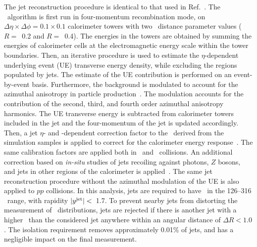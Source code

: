 
The jet reconstruction procedure is identical to that used in Ref.~\cite{2019108}. 
The \antikt\ algorithm is first run in four-momentum recombination mode, on
$\Delta \eta \times \Delta \phi = 0.1\times 0.1$  calorimeter towers with two \antikt\ distance parameter values ($R=$~0.2 and $R=$~0.4). The energies in the towers are obtained by summing the
	energies of calorimeter cells at the electromagnetic energy scale within the tower boundaries. Then,
	  an iterative procedure is used to estimate the $\eta$-dependent underlying event (UE)  transverse energy density, while excluding the regions populated by jets. The estimate of the UE contribution is performed on an event-by-event basis.
	Furthermore, the background is modulated to account for the azimuthal anisotropy in particle production~\cite{ATLAS:2012at}. The modulation accounts for the contribution of the second, third, and fourth order azimuthal anisotropy harmonics.
	The UE transverse energy is subtracted from calorimeter towers included in the jet and the four-momentum of the jet is updated accordingly.
	  Then, a jet $\eta$- and \pT-dependent  correction factor to the \ptjet\ 
	  derived from the simulation samples is applied to correct for the calorimeter energy
	  response~\cite{Aaboud:2017jcu}. The same calibration factors are applied both 
in \pp\ and \pbpb\ collisions.
An additional correction based on \textit{in-situ} studies of jets recoiling against photons, $Z$ bosons, and jets in other regions of the calorimeter is
	  applied~\cite{ATL-PHYS-PUB-2015-036,2019167}. The same jet reconstruction procedure without the
	  azimuthal modulation of the UE is also applied to $pp$ collisions.
	  In this analysis, jets are required to have \ptjet\ in the 126--316 \GeV\ range, with rapidity  $|\mbox{$y^{\mathrm{jet}}$}|<$~1.7. 
 To prevent nearby jets from distorting the measurement of \Dptr\ distributions, 
jets are rejected if there is another jet with a higher \ptjet\ than the considered jet anywhere
within an angular distance of $\Delta R < 1.0$. The isolation requirement removes approximately 0.01\% of jets, and has a negligible impact on the final measurement.

